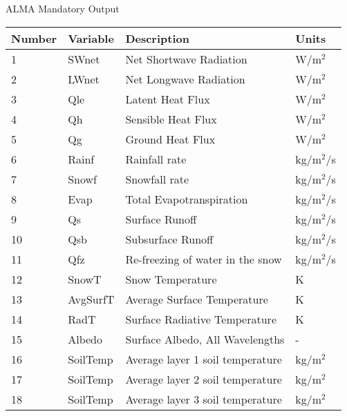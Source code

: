 
\setlength{\extrarowheight}{4pt}

\begin{verbatim}

\end{verbatim}

ALMA Mandatory Output

\begin{tabular}{|l|l|l|l|} \hline \label{table:vic_alma_out}
Number & Variable & Description                     & Units         \\ \hline
1  & SWnet        & Net Shortwave Radiation         & W/m$^2$       \\ \hline
2  & LWnet        & Net Longwave Radiation          & W/m$^2$       \\ \hline
3  & Qle          & Latent Heat Flux                & W/m$^2$       \\ \hline
4  & Qh           & Sensible Heat Flux              & W/m$^2$       \\ \hline
5  & Qg           & Ground Heat Flux                & W/m$^2$       \\ \hline
6  & Rainf        & Rainfall rate                   & kg/m$^2$/s    \\ \hline
7  & Snowf        & Snowfall rate                   & kg/m$^2$/s    \\ \hline
8  & Evap         & Total Evapotranspiration        & kg/m$^2$/s    \\ \hline
9  & Qs           & Surface Runoff                  & kg/m$^2$/s    \\ \hline
10 & Qsb          & Subsurface Runoff               & kg/m$^2$/s    \\ \hline
11 & Qfz          & Re-freezing of water in the snow& kg/m$^2$/s    \\ \hline
12 & SnowT        & Snow Temperature                & K             \\ \hline
13 & AvgSurfT     & Average Surface Temperature     & K             \\ \hline
14 & RadT         & Surface Radiative Temperature   & K             \\ \hline
15 & Albedo       & Surface Albedo, All Wavelengths & -             \\ \hline
16 & SoilTemp     & Average layer 1 soil temperature& kg/m$^2$      \\ \hline
17 & SoilTemp     & Average layer 2 soil temperature& kg/m$^2$      \\ \hline
18 & SoilTemp     & Average layer 3 soil temperature& kg/m$^2$      \\ \hline

\end{tabular}
